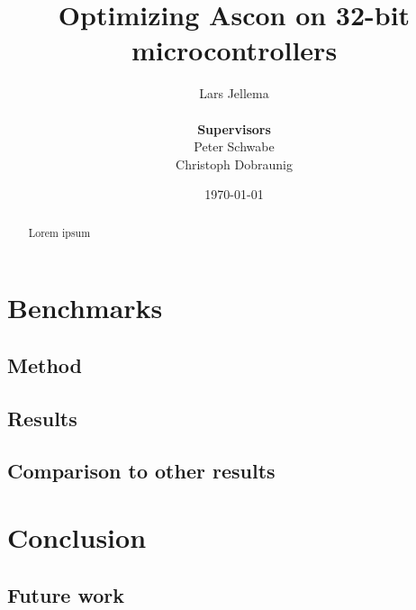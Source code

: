 \documentclass{article}
\title{Optimizing Ascon on 32-bit microcontrollers}
\author{Lars Jellema \\\\
    \textbf{\small Supervisors} \\
    \small Peter Schwabe \\
    \small Christoph Dobraunig}
\date{\today}
\begin{document}
\maketitle

\begin{abstract}
Lorem ipsum
\end{abstract}

\clearpage





\section{Benchmarks}

\subsection{Method}

\subsection{Results}

\subsection{Comparison to other results}

\section{Conclusion}

\subsection{Future work}




\begin{appendices}



\end{appendices}
\end{document}
